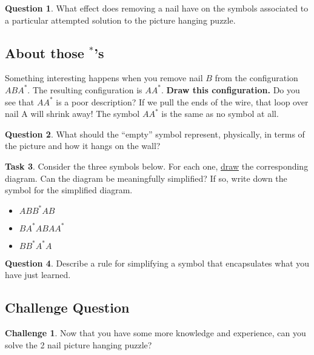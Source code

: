 \documentclass[12pt,letterpaper]{article}
\theoremstyle{definition}
\newtheorem{question}{Question}
\newtheorem*{challenge}{Challenge}
\newtheorem{task}[question]{Task}
\begin{document}
\begin{question}
What effect does removing a nail have on the symbols associated to a particular attempted solution to the picture hanging puzzle.
\end{question}

\subsection*{About those ${}^*$'s}

Something interesting happens when you remove nail $B$ from the configuration $ABA^*$.
The resulting configuration is $AA^*$.
\textbf{Draw this configuration.} 
Do you see that $AA^*$ is a poor description?
If we pull the ends of the wire, that loop over nail A will shrink away!
The symbol $AA^*$ is the same as no symbol at all.
\begin{question}
What should the ``empty'' symbol represent, physically, in terms of the picture and how it hangs on the wall?
\end{question}

\begin{task}
Consider the three symbols below.
For each one, \underline{draw} the corresponding diagram.
Can the diagram be meaningfully simplified?
If so, write down the symbol for the simplified diagram.
\begin{itemize}
\item $ABB^*AB$
\item $BA^*ABAA^*$
\item $BB^*A^*A$
\end{itemize}
\end{task}

\begin{question}
Describe a rule for simplifying a symbol that encapsulates what you have just learned.
\end{question}

\subsection*{Challenge Question}

\begin{challenge} 
Now that you have some more knowledge and experience, can you solve the 2 nail picture hanging puzzle?
\end{challenge}


\end{document}
